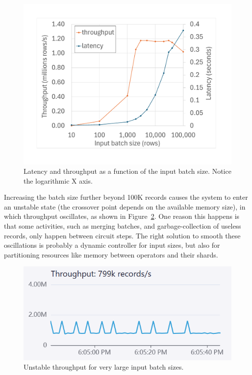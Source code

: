 \begin{figure}[h]
  \includegraphics[width=.90\columnwidth]{graph/batchsize}
  \caption{Latency and throughput as a function of the input batch
    size.  Notice the logarithmic X axis.\label{fig:batchsize}}
\end{figure}

Increasing the batch size further beyond 100K records causes the
system to enter an unstable state (the crossover point depends on the
available memory size), in which throughput oscillates, as shown in
Figure~\ref{fig:oscillation}.  One reason this happens is that some
activities, such as merging batches, and garbage-collection of useless
records, only happen between circuit steps.  The right solution to
smooth these oscillations is probably a dynamic controller for input
sizes, but also for partitioning resources like memory between \dbsp
operators and their shards.

\begin{figure}[h]
  \begin{center}
  \includegraphics[scale=.5]{graph/oscillation}
  \caption{Unstable throughput for very large input batch
    sizes\label{fig:oscillation}.}
  \end{center}
\end{figure}

